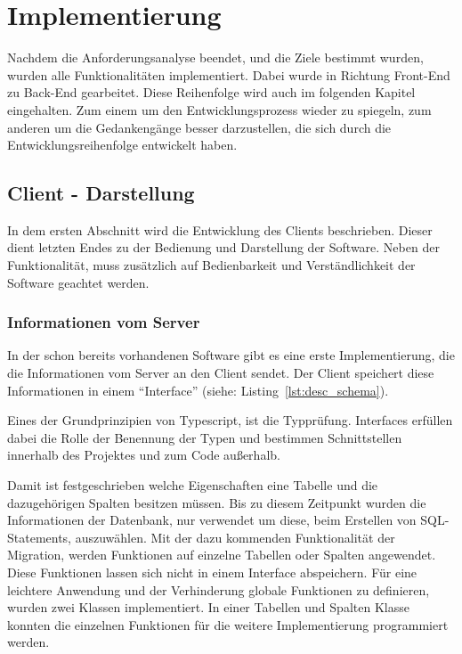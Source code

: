 \section{Implementierung}
\label{sec:implementierung}
Nachdem die Anforderungsanalyse beendet, und die Ziele bestimmt wurden, wurden alle Funktionalitäten implementiert. Dabei wurde in Richtung Front-End zu Back-End gearbeitet. Diese Reihenfolge wird auch im folgenden Kapitel eingehalten. Zum einem um den Entwicklungsprozess wieder zu spiegeln, zum anderen um die Gedankengänge besser darzustellen, die sich durch die Entwicklungsreihenfolge entwickelt haben.

\subsection{Client - Darstellung}
\label{subsec04:client_viz}
In dem ersten Abschnitt wird die Entwicklung des Clients beschrieben. Dieser dient letzten Endes zu der Bedienung und Darstellung der Software. Neben der Funktionalität, muss zusätzlich auf Bedienbarkeit und Verständlichkeit der Software geachtet werden.

\subsubsection{Informationen vom Server}
\label{subsubsec04:info_server}

In der schon bereits vorhandenen Software gibt es eine erste Implementierung, die die Informationen vom Server an den Client sendet.
Der Client speichert diese Informationen in einem ``Interface'' (siehe: Listing~\ref{lst:desc_schema}). 



Eines der Grundprinzipien von Typescript, ist die Typprüfung. Interfaces erfüllen dabei die Rolle der Benennung der Typen und bestimmen Schnittstellen innerhalb des Projektes und zum Code außerhalb.~\cite{typescript_interfaces}

Damit ist festgeschrieben welche Eigenschaften eine Tabelle und die dazugehörigen Spalten besitzen müssen. Bis zu diesem Zeitpunkt wurden die Informationen der Datenbank, nur verwendet um diese, beim Erstellen von SQL-Statements, auszuwählen. Mit der dazu kommenden Funktionalität der Migration, werden Funktionen auf einzelne Tabellen oder Spalten angewendet. Diese Funktionen lassen sich nicht in einem Interface abspeichern. Für eine leichtere Anwendung und der Verhinderung globale Funktionen zu definieren, wurden zwei Klassen implementiert. In einer Tabellen und Spalten Klasse konnten die einzelnen Funktionen für die weitere Implementierung programmiert werden.


